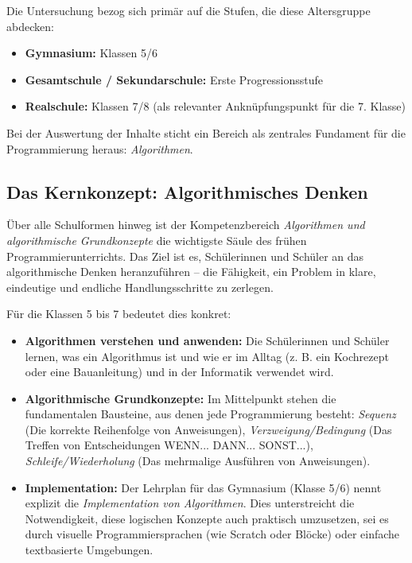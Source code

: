 \documentclass[a5paper,pagesize,10pt,bibtotoc,pointlessnumbers,
normalheadings,DIV=9,twoside=false]{scrbook}
\begin{document}
Die Untersuchung bezog sich primär auf die Stufen, die diese Altersgruppe abdecken:

\begin{itemize}
    \item \textbf{Gymnasium:} Klassen 5/6
    \item \textbf{Gesamtschule / Sekundarschule:} Erste Progressionsstufe
    \item \textbf{Realschule:} Klassen 7/8 (als relevanter Anknüpfungspunkt für die 7. Klasse)
\end{itemize}

Bei der Auswertung der Inhalte sticht ein Bereich als zentrales Fundament für die Programmierung heraus: \textit{Algorithmen}.

\subsection*{Das Kernkonzept: Algorithmisches Denken}

Über alle Schulformen hinweg ist der Kompetenzbereich \textit{Algorithmen und algorithmische Grundkonzepte} die wichtigste Säule des frühen Programmierunterrichts. Das Ziel ist es, Schülerinnen und Schüler an das algorithmische Denken heranzuführen -- die Fähigkeit, ein Problem in klare, eindeutige und endliche Handlungsschritte zu zerlegen.

Für die Klassen 5 bis 7 bedeutet dies konkret:

\begin{itemize}
    \item \textbf{Algorithmen verstehen und anwenden:} Die Schülerinnen und Schüler lernen, was ein Algorithmus ist und wie er im Alltag (z. B. ein Kochrezept oder eine Bauanleitung) und in der Informatik verwendet wird.
    \item \textbf{Algorithmische Grundkonzepte:} Im Mittelpunkt stehen die fundamentalen Bausteine, aus denen jede Programmierung besteht: \textit{Sequenz} (Die korrekte Reihenfolge von Anweisungen), \textit{Verzweigung/Bedingung} (Das Treffen von Entscheidungen WENN... DANN... SONST...), \textit{Schleife/Wiederholung} (Das mehrmalige Ausführen von Anweisungen).
    \item \textbf{Implementation:} Der Lehrplan für das Gymnasium (Klasse 5/6) nennt explizit die \textit{Implementation von Algorithmen}. Dies unterstreicht die Notwendigkeit, diese logischen Konzepte auch praktisch umzusetzen, sei es durch visuelle Programmiersprachen (wie Scratch oder Blöcke) oder einfache textbasierte Umgebungen.
\end{itemize}
\end{document}
